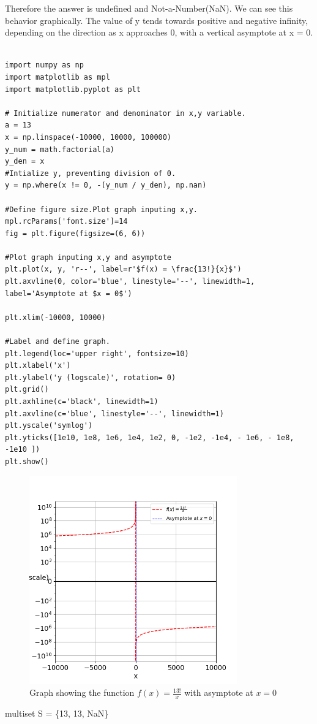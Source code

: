 \documentclass{article}
\begin{document}
Therefore the answer is undefined and Not-a-Number(NaN).
 We can see this behavior graphically. The value of y tends towards positive and negative infinity, depending on the direction as x approaches 0, with a vertical asymptote at x = 0.
\begin{lstlisting}
    
import numpy as np
import matplotlib as mpl
import matplotlib.pyplot as plt

# Initialize numerator and denominator in x,y variable.
a = 13
x = np.linspace(-10000, 10000, 100000)
y_num = math.factorial(a)
y_den = x
#Intialize y, preventing division of 0.
y = np.where(x != 0, -(y_num / y_den), np.nan)

#Define figure size.Plot graph inputing x,y. 
mpl.rcParams['font.size']=14
fig = plt.figure(figsize=(6, 6))

#Plot graph inputing x,y and asymptote
plt.plot(x, y, 'r--', label=r'$f(x) = \frac{13!}{x}$')
plt.axvline(0, color='blue', linestyle='--', linewidth=1, label='Asymptote at $x = 0$')

plt.xlim(-10000, 10000)

#Label and define graph.
plt.legend(loc='upper right', fontsize=10)
plt.xlabel('x')
plt.ylabel('y (logscale)', rotation= 0)
plt.grid()
plt.axhline(c='black', linewidth=1)
plt.axvline(c='blue', linestyle='--', linewidth=1)
plt.yscale('symlog') 
plt.yticks([1e10, 1e8, 1e6, 1e4, 1e2, 0, -1e2, -1e4, - 1e6, - 1e8, -1e10 ])
plt.show()

\end{lstlisting}

\begin{figure}[h!]
    \centering
    \includegraphics[width=0.8\textwidth]{Figure_1-assignment.png} 
    \caption{Graph showing the function \( f(x) = \frac{13!}{x} \) with asymptote at \( x = 0 \)}
    \label{fig:graph}
\end{figure}
multiset S = \{13, 13, NaN\}
\end{document}
